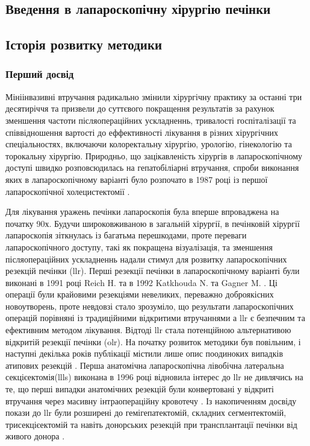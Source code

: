 \begin{refsection}
\chapter{Введення в лапароскопічну хірургію печінки}
\section{Історія розвитку методики}
\subsection{Перший досвід}
Мініінвазивні втручання радикально змінили хірургічну практику за останні три десятиріччя та призвели до суттєвого покращення результатів за рахунок зменшення частоти післяопераційних ускладненнь, тривалості госпіталізації та співвідношення вартості до еффективності лікування в різних хірургічних спеціальностях, включаючи колоректальну хірургію, урологію, гінекологію та торокальну хірургію. Природньо, що зацікавленість хірургів в лапароскопічному доступі швидко розповсюдилась на гепатобіліарні втручання, спроби виконання яких в лапароскопічному варіанті було розпочато в 1987 році із першої лапароскопічної холецистектомії \cite{Litynski}. 

Для лікування уражень печінки лапароскопія була вперше впроваджена на початку 90х. Будучи широковживаною в загальній хірургії, в печінковій хірургії лапароскопія зіткнулась із багатьма перешкодами, проте переваги лапароскопічного доступу, такі як покращена візуалізація, та зменшення післяопераційних ускладненнь  надали стимул для розвитку лапароскопічних резекцій печінки (\acrshort{llr}). Перші резекції печінки в лапароскопічному варіанті були виконані в 1991 році Reich H. \cite{Reich1991a} та  в 1992 Katkhouda N. \cite{Katkhouda1992} та Gagner M. \cite{GAGNER1992}. Ці операції були крайовими резекціями невеликих, переважно доброякісних новоутворень, проте невдовзі стало зрозуміло, що результати лапароскопічних операцій порівняні із традиційними відкритими втручаннями а \acrshort{llr} є безпечним та ефективним методом лікування. Відтоді \acrshort{llr} стала потенційною альтернативою відкритій резекції печінки (\acrshort{olr}). 
На початку розвиток методики був повільним, і наступні декілька років публікації містили лише опис поодиноких випадків атипових резекцій \cite{Klotz1993, Cunningham1995}. Перша анатомічна лапароскопічна лівобічна латеральна секцієектомія(\acrshort{llls}) виконана в 1996 році \cite{Azagra1996}  відновила інтерес до \acrshort{llr} не дивлячись на те, що перші випадки анатомічних резекцій були конвертовані у відкриті втручання через масивну інтраопераційну кровотечу \cite{Hashizume1995}.  Із накопиченням досвіду покази до \acrshort{llr} були розширені до гемігепатектомій, складних сегментектомій, трисекцієектомій та навіть донорських резекцій при трансплантації печінки від живого донора \cite{Dagher2009, Cherqui2002, Jia2018}. 


\end{refsection}
